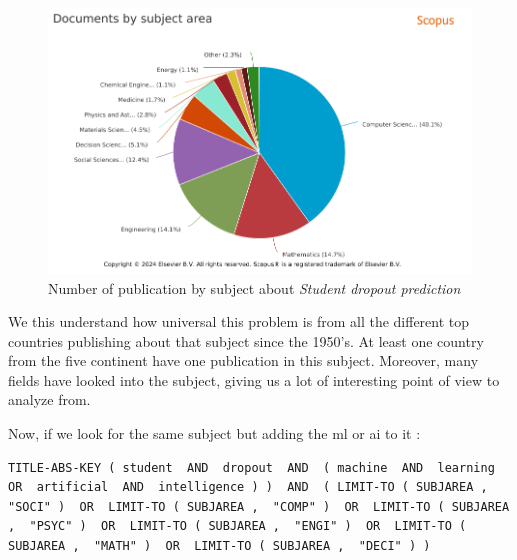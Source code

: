 \documentclass[../../main.tex]{subfiles}
\begin{document}
\begin{figure}
    \centering
    \includegraphics[width=1\linewidth]{res//graph/prediction student/Scopus-Analyze-Subject.png}
    \caption{Number of publication by subject about \textit{Student dropout prediction}}
    \label{fig:nb_pub_scopus_predictstudent_subject}
\end{figure}

We this understand how universal this problem is from all the different top countries publishing about that subject since the 1950's. At least one country from the five continent have one publication in this subject. Moreover, many fields have looked into the subject, giving us a lot of interesting point of view to analyze from.

Now, if we look for the same subject but adding the \acrshort{ml} or \acrshort{ai} to it :
\begin{lstlisting}[breaklines]
TITLE-ABS-KEY ( student  AND  dropout  AND  ( machine  AND  learning  OR  artificial  AND  intelligence ) )  AND  ( LIMIT-TO ( SUBJAREA ,  "SOCI" )  OR  LIMIT-TO ( SUBJAREA ,  "COMP" )  OR  LIMIT-TO ( SUBJAREA ,  "PSYC" )  OR  LIMIT-TO ( SUBJAREA ,  "ENGI" )  OR  LIMIT-TO ( SUBJAREA ,  "MATH" )  OR  LIMIT-TO ( SUBJAREA ,  "DECI" ) )
\end{lstlisting}
\end{document}
